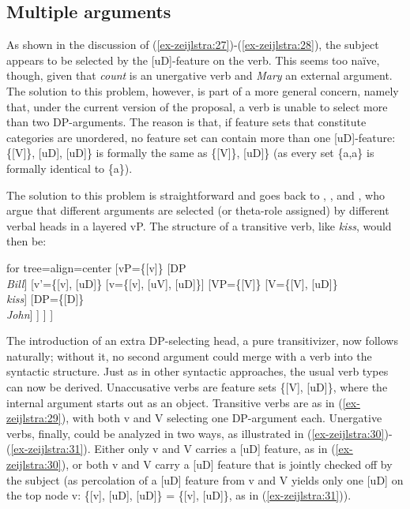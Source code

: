 \documentclass[output=paper
,modfonts
,nonflat]{langsci/langscibook}
\begin{document}
\subsection{Multiple arguments} \label{sec-zeijlstra:3.5}
As shown in the discussion of (\ref{ex-zeijlstra:27})-(\ref{ex-zeijlstra:28}), the subject appears to be selected by the [uD]-feature on the verb. This seems too naïve, though, given that \textit{count} is an unergative verb and \textit{Mary} an external argument. The solution to this problem, however, is part of a more general concern, namely that, under the current version of the proposal, a verb is unable to select more than two DP-arguments. The reason is that, if feature sets that constitute categories are unordered, no feature set can contain more than one [uD]-feature: \{[V]\}, [uD], [uD]\} is formally the same as \{[V]\}, [uD]\} (as every set \{a,a\} is formally identical to \{a\}).

The solution to this problem is straightforward and goes back to \citet{Larson1988},  \citet{Hale_Keyser1993}, and \citet{Kratzer1996}, who argue that different arguments are selected (or theta-role assigned) by different verbal heads in a layered vP. The structure of a transitive verb, like \textit{kiss}, would then be: 

	\begin{exe}
    \ex\label{ex-zeijlstra:29}
			\begin{forest}	for tree={align=center}
				[vP{=}\{{[}v{]}\}
				[DP\\ \textit{Bill}]
				[v'{=}\{{[}v{]}{,} {[}uD{]}\}
				[v{=}\{{[}v{]}{,} {[}uV{]}{,} {[}uD{]}\}]
				[VP{=}\{{[}V{]}\} 
				[V{=}\{{[}V{]}{,} {[}uD{]}\}\\\textit{kiss}]
				[DP{=}\{{[}D{]}\}\\ \textit{John}]
				] ] ] 
		\end{forest}
	\end{exe}
\noindent The introduction of an extra DP-selecting head, a pure transitivizer, now follows naturally; without it, no second argument could merge with a verb into the syntactic structure. Just as in other syntactic approaches, the usual verb types can now be derived. Unaccusative verbs are feature sets \{[V], [uD]\}, where the internal argument starts out as an object. Transitive verbs are as in (\ref{ex-zeijlstra:29}), with both v and V selecting one DP-argument each. Unergative verbs, finally, could be analyzed in two ways, as illustrated in (\ref{ex-zeijlstra:30})-(\ref{ex-zeijlstra:31}). Either only v and V carries a [uD] feature, as in (\ref{ex-zeijlstra:30}), or both v and V carry a [uD] feature that is jointly checked off by the subject (as percolation of a [uD] feature from v and V yields only one [uD] on the top node v: \{[v], [uD], [uD]\} = \{[v], [uD]\}, as in (\ref{ex-zeijlstra:31})).
\end{document}

